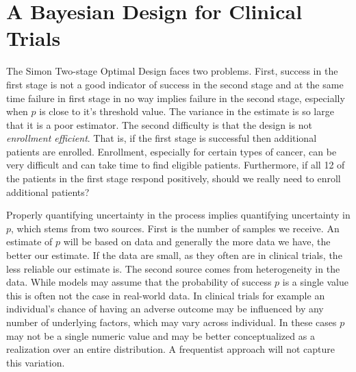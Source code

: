 \documentclass[12pt]{article}         %
\begin{document}
\section{A Bayesian Design for Clinical Trials}


The Simon Two-stage Optimal Design faces two problems. 
First, success in the first stage is not a good indicator of success 
in the second stage and at the same time failure in first stage in no way 
implies failure in the second stage, especially when $p$ is close to it's 
threshold value. The variance in the estimate is so large that it is a poor 
estimator. The second difficulty is that the design is not {\em enrollment 
efficient}. That is, if the first stage is successful then additional patients 
are enrolled. Enrollment, especially for certain types of cancer, can be very 
difficult and can take time to find eligible patients. Furthermore, if 
all 12 of the patients in the first stage respond positively, should we 
really need to enroll additional patients?

Properly quantifying uncertainty in the process implies quantifying 
uncertainty in $p$, which stems from two sources. First is the number of 
samples we receive. An estimate of $p$ will be based on data and generally 
the more data we have, the better our estimate. If the data are small, as 
they often are in clinical trials, the less reliable our estimate is. The 
second source comes from heterogeneity in the data. While models may assume 
that the probability of success $p$ is a single value this is often not the 
case in real-world data. In clinical trials for example an individual's chance 
of having an adverse outcome may be influenced by any number of underlying 
factors, which may vary across individual. In these cases $p$ may not be a 
single numeric value and may be better conceptualized as a realization over 
an entire distribution. A frequentist approach will not capture this variation.
\end{document}
